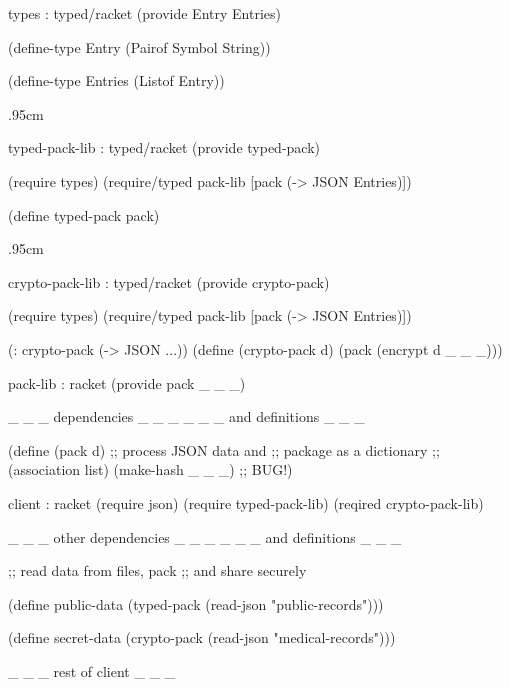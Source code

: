 \def\spacrr{.95cm}
\begin{figure*}[hb]

\begin{minipage}[b]{6.1cm}
\begin{module}{types : typed/racket}\typecolor
(provide Entry Entries)

(define-type Entry
  (Pairof Symbol String))

(define-type Entries
  (Listof Entry))
\end{module}

\vspace\spacrr

\begin{module}{typed-pack-lib : typed/racket}\typecolor
(provide typed-pack)

(require types)
(require/typed pack-lib
  [pack (-> JSON Entries)])

(define typed-pack pack) 
\end{module}

\vspace\spacrr

\begin{module}{crypto-pack-lib : typed/racket}\typecolor
(provide crypto-pack) 

(require types)
(require/typed pack-lib
 [pack (-> JSON Entries)])

(: crypto-pack (-> JSON ...))
(define (crypto-pack d)
  (pack (encrypt d _ _ _)))
\end{module}\end{minipage}\hfil\begin{minipage}[b]{6.1cm}
\begin{module}{pack-lib : racket}\dyncolor
(provide pack _ _ _)

_ _ _  dependencies     _ _ _
_ _ _  and definitions  _ _ _

(define (pack d)
  ;; process JSON data and 
  ;; package as a dictionary
  ;; (association list)
  (make-hash _ _ _) ;; BUG!)
\end{module}
\begin{module}{client : racket}\dyncolor
(require json)
(require typed-pack-lib)
(reqired crypto-pack-lib)

_ _ _ other dependencies _ _ _
_ _ _ and definitions    _ _ _
          
;; read data from files, pack 
;; and share securely 

(define public-data 
  (typed-pack 
   (read-json 
    "public-records")))

(define secret-data 
  (crypto-pack 
   (read-json 
    "medical-records")))
 
 _ _ _ rest of client _ _ _
\end{module}
\end{minipage}


\caption{One mix-typed program, three interpretations} \label{fig:example}
\end{figure*}
